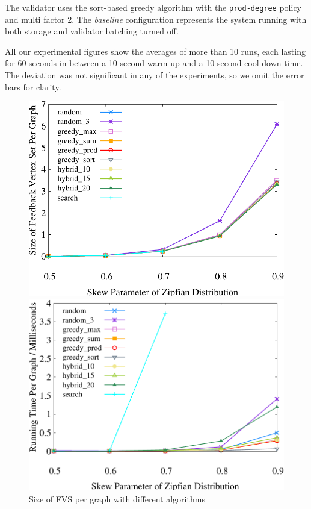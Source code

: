 The validator uses the sort-based greedy algorithm with the \texttt{prod-degree} policy and multi factor 2. The \emph{baseline} configuration represents the system running with both storage and validator batching turned off. 

All our experimental figures show the averages of more than 10 runs, each lasting for 60 seconds in between a 10-second warm-up and a 10-second cool-down time. The deviation was not significant in any of the experiments, so we omit the error bars for clarity.

\begin{figure}[t]
    \centering
    \begin{minipage}[b]{0.32\linewidth}
        \centering
        \includegraphics[width=\textwidth]{./exp_fig/fvs/fvs}
        \vspace{-2em}
        \caption{Size of FVS per graph with different algorithms}
        \label{fig:fvs:fvs}
    \end{minipage}
    \begin{minipage}[b]{0.32\linewidth}
        \centering
        \includegraphics[width=\textwidth]{./exp_fig/fvs/latency}

\end{minipage}
\end{figure}
